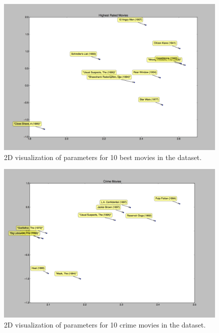 \pagebreak

\begin{figure}[H]
\centering
\includegraphics[width=\textwidth]{highest_2d_vis}
\caption{2D visualization of parameters for 10 best movies in the dataset.}
\end{figure}



\pagebreak

\begin{figure}[H]
\centering
\includegraphics[width=\textwidth]{crime_2d_vis}
\caption{2D visualization of parameters for 10 crime movies in the dataset.}
\end{figure}


\pagebreak

